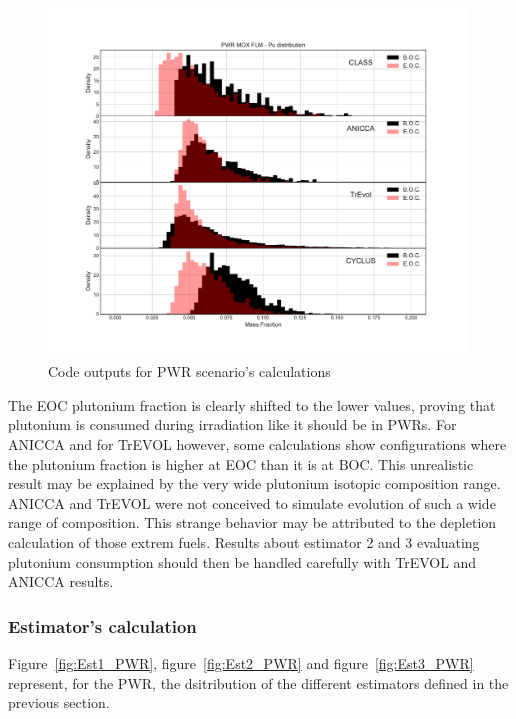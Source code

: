 \begin{figure}[h]
	\begin{center}
		\includegraphics[width = 0.99\textwidth]{../../Feature_1/RAW_DATA/FIG/PWR_MOX_FLM_Pu.pdf}
		\caption{Code outputs for \gls{PWR} scenario's calculations}
		\label{fig:PWR_MOX_FLM_Pu}
	\end{center}
\end{figure}

The EOC plutonium fraction is clearly shifted to the lower values, proving that
plutonium is consumed during irradiation like it should be in \gls{PWR}s. For ANICCA
and for TrEVOL however, some calculations show configurations where the
plutonium fraction is higher at EOC than it is at \gls{BOC}. This unrealistic
result may be explained by the very wide plutonium isotopic composition range.
ANICCA and TrEVOL were not conceived to simulate evolution of such a wide range
of composition. This strange behavior may be attributed to the depletion
calculation of those extrem fuels. Results about estimator 2 and 3 evaluating
plutonium consumption should then be handled carefully with TrEVOL and ANICCA
results.   


\subsubsection{Estimator's calculation}

Figure~\ref{fig:Est1_PWR}, figure~\ref{fig:Est2_PWR} and
figure~\ref{fig:Est3_PWR} represent, for the \gls{PWR}, the dsitribution of the
different estimators defined in the previous section. 

